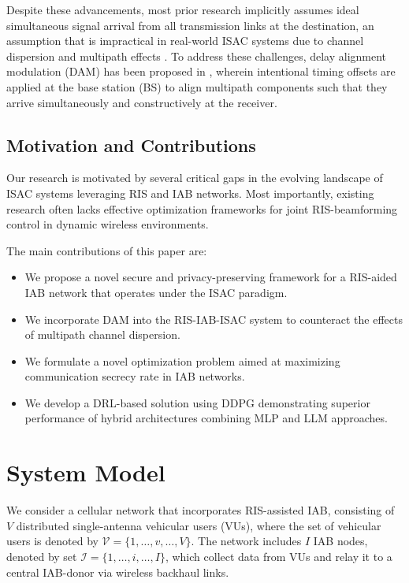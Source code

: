 \documentclass[journal]{IEEEtran}
\begin{document}
Despite these advancements, most prior research implicitly assumes ideal simultaneous signal arrival from all transmission links at the destination, an assumption that is impractical in real-world ISAC systems due to channel dispersion and multipath effects \cite{Zhao2021}. To address these challenges, delay alignment modulation (DAM) has been proposed in \cite{Lu2022}, wherein intentional timing offsets are applied at the base station (BS) to align multipath components such that they arrive simultaneously and constructively at the receiver.

\subsection{Motivation and Contributions}

Our research is motivated by several critical gaps in the evolving landscape of ISAC systems leveraging RIS and IAB networks. Most importantly, existing research often lacks effective optimization frameworks for joint RIS-beamforming control in dynamic wireless environments.

The main contributions of this paper are:
\begin{itemize}
    \item We propose a novel secure and privacy-preserving framework for a RIS-aided IAB network that operates under the ISAC paradigm.
    \item We incorporate DAM into the RIS-IAB-ISAC system to counteract the effects of multipath channel dispersion.
    \item We formulate a novel optimization problem aimed at maximizing communication secrecy rate in IAB networks.
    \item We develop a DRL-based solution using DDPG demonstrating superior performance of hybrid architectures combining MLP and LLM approaches.
\end{itemize}

\section{System Model}\label{Sec:SysModel}

We consider a cellular network that incorporates RIS-assisted IAB, consisting of $V$ distributed single-antenna vehicular users (VUs), where the set of vehicular users is denoted by $\mathcal{V} = \{1, \ldots, v, \ldots, V\}$. The network includes $I$ IAB nodes, denoted by set $\mathcal{I} = \{1, \ldots, i, \ldots, I\}$, which collect data from VUs and relay it to a central IAB-donor via wireless backhaul links.
\end{document}

